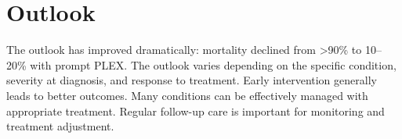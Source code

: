 \section{Outlook}
The outlook has improved dramatically: mortality declined from >90\% to 10--20\% with prompt PLEX. The outlook varies depending on the specific condition, severity at diagnosis, and response to treatment. Early intervention generally leads to better outcomes. Many conditions can be effectively managed with appropriate treatment. Regular follow-up care is important for monitoring and treatment adjustment.
